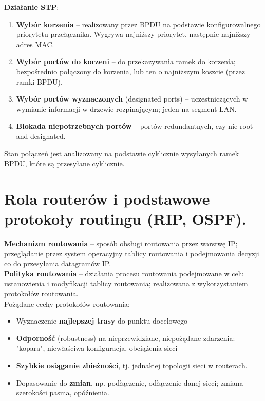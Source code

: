 \documentclass[main.tex]{subfiles}
\begin{document}
    \noindent\textbf{Działanie STP}:
    \begin{enumerate}[noitemsep]
        \item \textbf{Wybór korzenia} -- realizowany przez BPDU na podstawie konfigurowalnego priorytetu przełącznika.
        Wygrywa najniższy priorytet, następnie najniższy adres MAC.

        \item \textbf{Wybór portów do korzeni} -- do przekazywania ramek do korzenia; bezpośrednio
        połączony do korzenia, lub ten o najniższym koszcie (przez ramki BPDU).

        \item \textbf{Wybór portów wyznaczonych} (designated ports) -- uczestniczących w wymianie informacji w drzewie
        rozpinającym; jeden na segment LAN.

        \item \textbf{Blokada niepotrzebnych portów} -- portów redundantnych, czy nie root and designated.
    \end{enumerate}
    Stan połączeń jest analizowany na podstawie cyklicznie wysyłanych ramek BPDU, które są przesyłane cyklicznie.


    \section{Rola routerów i podstawowe protokoły routingu (RIP, OSPF).}

    \textbf{Mechanizm routowania} -- sposób obsługi routowania przez warstwę IP; przeglądanie przez system operacyjny
    tablicy routowania i podejmowania decyzji co do przesyłania datagramów IP.\\

    \noindent \textbf{Polityka routowania} -- działania procesu routowania podejmowane w celu ustanowienia i modyfikacji
    tablicy routowania; realizowana z wykorzystaniem protokołów routowania.\\

    \noindent Pożądane cechy protokołów routowania:
    \begin{itemize}[noitemsep]
        \item Wyznaczenie \textbf{najlepszej trasy} do punktu docelowego
        \item \textbf{Odporność} (robustness) na nieprzewidziane, niepożądane zdarzenia:
        "kopara", niewłaściwa konfiguracja, obciążenia sieci
        \item \textbf{Szybkie osiąganie zbieżności}, tj. jednakiej topologii sieci w routerach.
        \item Dopasowanie do \textbf{zmian}, np. podłączenie, odłączenie danej sieci; zmiana szerokości pasma, opóźnienia.
    \end{itemize}
\end{document}
